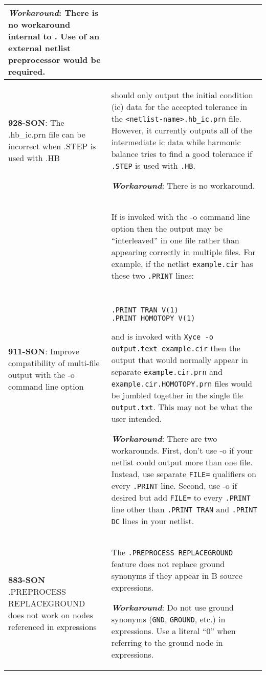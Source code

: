 {\begin{longtable}[h] {>{\raggedright\small}m{2in}|>{\raggedright\let\\\tabularnewline\small}m{3.5in}}
\textbf{\textit{Workaround}}: There is no workaround internal to \Xyce{}.
Use of an external netlist preprocessor would be required. \\ \hline

\textbf{928-SON}: The .hb\_ic.prn file can be incorrect when .STEP is used
with .HB & \Xyce{} should only output the initial condition (ic) data
for the accepted tolerance in the \texttt{<netlist-name>.hb\_ic.prn}
file.  However, it currently outputs all of the intermediate ic data
while harmonic balance tries to find a good tolerance
if \texttt{.STEP} is used with \texttt{.HB}.

\textbf{\textit{Workaround}}: There is no workaround. \\ \hline

\textbf{911-SON}:  Improve compatibility of multi-file output with the -o
command line option & If \Xyce{} is invoked with the -o command line
option then the output may be ``interleaved'' in one file rather than
appearing correctly in multiple files.  For example, if the
netlist \texttt{example.cir} has these two \texttt{.PRINT} lines: {\tt
\begin{verbatim}
.PRINT TRAN V(1)
.PRINT HOMOTOPY V(1)
\end{verbatim}
}
and is invoked with \texttt{Xyce -o output.text example.cir} then the
output that would normally appear in separate \texttt{example.cir.prn}
and \texttt{example.cir.HOMOTOPY.prn} files would be jumbled together
in the single file \texttt{output.txt}.  This may not be what the user
intended.

\textbf{\textit{Workaround}}: There are two workarounds.  First, don't use -o
if your netlist could output more than one file.  Instead, use
separate \texttt{FILE=} qualifiers on every \texttt{.PRINT} line.
Second, use -o if desired but add
\texttt{FILE=} to every \texttt{.PRINT} line other than \texttt{.PRINT TRAN}
and \texttt{.PRINT DC} lines in your netlist.\\ \hline

\textbf{883-SON} .PREPROCESS REPLACEGROUND does not work on nodes referenced
in expressions & The \texttt{.PREPROCESS REPLACEGROUND} feature does
not replace ground synonyms if they appear in B source expressions.

\textbf{\textit{Workaround}}: Do not use ground synonyms (\texttt{GND},
\texttt{GROUND}, etc.) in expressions.  Use a literal ``0'' when
referring to the ground node in expressions.\\ \hline


\end{longtable}}
